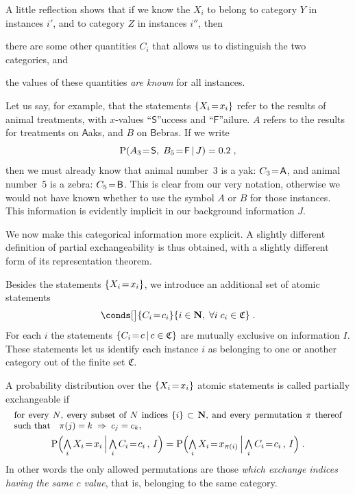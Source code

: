 \documentclass[\ifafour a4paper,12pt,\else a5paper,10pt,\fi%
onecolumn,oneside,article,%
british%
]{memoir}
\theoremstyle{remark}
\theoremstyle{innote}
\newcommand*{\NN}{\bm{\mathrm{N}}}
\newcommand*{\Land}{\mathop{\textstyle\bigwedge}}
\DeclarePairedDelimiter\set{\{}{\}}
\newcommand*{\p}{\mathrm{P}}%
\renewcommand*{\|}[1][]{\nonscript\,#1\vert\nonscript\,\mathopen{}}
\newcommand*{\mathbox}[2][.8]{\parbox[b]{#1\columnwidth}{#2}}
\renewcommand*{\=}{\TextOrMath\texteq\eq}
\newcommand*{\X}[1]{X_{#1}}
\newcommand*{\x}[1]{x_{#1}}
\newcommand*{\A}[1]{A_{#1}}
\newcommand*{\B}[1]{B_{#1}}
\newcommand*{\C}[1]{C_{#1}}
\newcommand*{\cc}[1]{c_{#1}}
\newcommand*{\sC}{\mathfrak{C}}
\newcommand*{\xs}{\textsf{S}}
\newcommand*{\xf}{\textsf{F}}
\newcommand*{\xA}{\textsf{A}}
\newcommand*{\xB}{\textsf{B}}
\newcommand*{\zI}{J}
\begin{document}
A little reflection shows that if we know the $\X{i}$ to belong to category
$Y$ in instances $i'$, and to category $Z$ in instances $i''$, then
\begin{enumerate*}[label=(\roman*)]
\item there are some other quantities $\C{i}$ that allows us to distinguish
  the two categories, and \item the values %
  of these quantities \emph{are known} for all instances.
\end{enumerate*}

Let us say, for example, that the statements $\set{\X{i}\=\x{i}}$ refer to
the results of animal treatments, with $x$-values \enquote{$\xs$}uccess and
\enquote{$\xf$}ailure. $A$ refers to the results for treatments on
$\xA$aks, and $B$ on $\xB$ebras. If we write
$$\p(\A{3}\=\xs,\;\B{5}\=\xf \| \zI)=0.2\;,$$
then we must already know that animal number~$3$ is a yak: $\C{3}\=\xA$,
and animal number~$5$ is a zebra: $\C{5}\=\xB$. This is clear from our very
notation, otherwise we would not have known whether to use the symbol $A$
or $B$ for those instances. This information is evidently implicit in our
background information $\zI$.

We now make this categorical information more explicit. A slightly
different definition of partial exchangeability is thus obtained, with a
slightly different form of its representation theorem.



Besides the statements $\set{\X{i}\=\x{i}}$, we introduce an additional set
of atomic statements
\begin{equation}
  \label{eq:category_statements}
  \conds[\big]{\C{i}\=\cc{i}}{i \in \NN,\;
 \forall i\;\cc{i} \in \sC} \;.
\end{equation}
For each $i$ the statements $\set{\C{i}\=c \| c \in \sC}$ are mutually
exclusive on information $I$.
These statements let us identify each instance $i$ as belonging to one
or another category out of the finite set $\sC$.

A probability distribution over the $\set{\X{i}\=\x{i}}$ atomic statements
is called partially exchangeable if
\begin{multline}
  \label{eq:part_exchangeable}
  \mathbox[0.99]{\small for every $N$, every subset of $N$ indices $\set{i}
    \subset \NN$, and every permutation $\pi$ thereof such that\quad
    $\pi(j)=k \mathrel{\;\Rightarrow\;} \cc{j}=\cc{k}$,}
  \\
  \p\Bigl( \Land_{i}\X{i}\=\x{i}  \|[\Big]
  \Land_{i}\C{i}\=\cc{i}\,,\,    I\Bigr) =
  \p\Bigl( \Land_{i}\X{i}\=\x{\pi(i)}  \|[\Big]
  \Land_{i}\C{i}\=\cc{i}\,,\,    I\Bigr)
  \;.
\end{multline}
In other words the only allowed permutations are those \emph{which exchange
  indices having the same $c$ value}, that is, belonging to the same
category.
\end{document}
